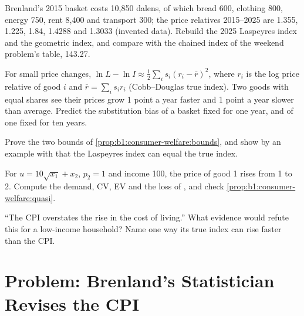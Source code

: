 \begin{exercise}[$\star\star$]\label{exo:b1:consumer-welfare:basket}
Brenland's 2015 basket costs 10,850 dalens, of which bread 600, clothing 800,
energy 750, rent 8,400 and transport 300; the price relatives 2015--2025 are
1.355, 1.225, 1.84, 1.4288 and 1.3033 (invented data). Rebuild the 2025
Laspeyres index and the geometric index, and compare with the chained index
of the weekend problem's table, 143.27. %
\end{exercise}

\begin{exercise}[$\star\star$]\label{exo:b1:consumer-welfare:spread}
For small price changes,
$\ln L - \ln I \approx \tfrac12\sum_i s_i(r_i - \bar r)^2$, where $r_i$ is the log
price relative of good $i$ and $\bar r = \sum_i s_ir_i$ (Cobb--Douglas true index).
Two goods with equal shares see their prices grow 1 point a year faster and
1 point a year slower than average. Predict the substitution bias of a
basket fixed for one year, and of one fixed for ten years.
\end{exercise}

\begin{exercise}[$\star\star\star$]\label{exo:b1:consumer-welfare:prove-bound}
Prove the two bounds of \cref{prop:b1:consumer-welfare:bounds}, and show by
an example with  that the Laspeyres index can equal the
true index.
\end{exercise}

\begin{exercise}[$\star\star\star$]\label{exo:b1:consumer-welfare:quasi}
For $u = 10\sqrt{x_1} + x_2$, $p_2 = 1$ and income 100, the price of good 1 rises
from 1 to 2. Compute the demand, CV, EV and the loss of ,
and check \cref{prop:b1:consumer-welfare:quasi}.
\end{exercise}

\begin{exercise}[$\star\star\star$]\label{exo:b1:consumer-welfare:low-income}
``The CPI overstates the rise in the cost of living.'' What evidence would
refute this for a low-income household? Name one way its true index can
rise faster than the CPI.
\end{exercise}

\section{Problem: Brenland's Statistician Revises the CPI}\label{sec:b1:consumer-welfare:problem}


